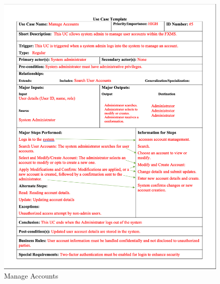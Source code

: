 \documentclass[a4paper]{report}
\begin{document}
\begin{figure}[h!]
    \centering
    \includegraphics[width=\textwidth]{images/uc/5-manage-accounts.png}
    \caption{Manage Accounts}
    \label{fig:5-manage-accounts}
\end{figure}
\end{document}
